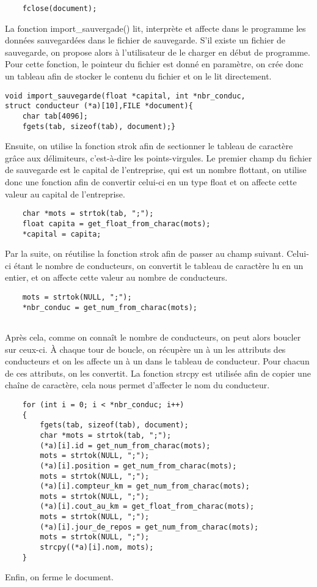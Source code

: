 \documentclass[a4paper, 12pt]{article}
\begin{document}
\begin{lstlisting}
    fclose(document);
\end{lstlisting}

        La fonction import\_sauvergade() lit, interprète et affecte dans le programme les données sauvegardées dans le fichier de sauvegarde. S’il existe un fichier de sauvegarde, on propose alors à l'utilisateur de le charger en début de programme.
        \newline
        Pour cette fonction, le pointeur du fichier est donné en paramètre, on crée donc un tableau afin de stocker le contenu du fichier et on le lit directement.
        \begin{lstlisting}
void import_sauvegarde(float *capital, int *nbr_conduc,
struct conducteur (*a)[10],FILE *document){
    char tab[4096];
    fgets(tab, sizeof(tab), document);}

\end{lstlisting}
    Ensuite, on utilise la fonction strok afin de sectionner le tableau de caractère grâce aux délimiteurs, c'est-à-dire les points-virgules. Le premier champ du fichier de sauvegarde est le capital de l'entreprise, qui est un nombre flottant, on utilise donc une fonction afin de convertir celui-ci en un type float et on affecte cette valeur au capital de l'entreprise.
\begin{lstlisting}
    char *mots = strtok(tab, ";");
    float capita = get_float_from_charac(mots);
    *capital = capita;
\end{lstlisting}
    Par la suite, on réutilise la fonction strok afin de passer au champ suivant. Celui-ci étant le nombre de conducteurs, on convertit le tableau de caractère lu en un entier, et on affecte cette valeur au nombre de conducteurs.
\begin{lstlisting}
    mots = strtok(NULL, ";"); 
    *nbr_conduc = get_num_from_charac(mots);
    
\end{lstlisting}
    Après cela, comme on connaît le nombre de conducteurs, on peut alors boucler sur ceux-ci. À chaque tour de boucle, on récupère un à un les attributs des conducteurs et on les affecte un à un dans le tableau de conducteur. Pour chacun de ces attributs, on les convertit. La fonction strcpy est utilisée afin de copier une chaîne de caractère, cela nous permet d'affecter le nom du conducteur.
\begin{lstlisting}
    for (int i = 0; i < *nbr_conduc; i++)
    {
        fgets(tab, sizeof(tab), document);
        char *mots = strtok(tab, ";");
        (*a)[i].id = get_num_from_charac(mots);
        mots = strtok(NULL, ";");
        (*a)[i].position = get_num_from_charac(mots);
        mots = strtok(NULL, ";");
        (*a)[i].compteur_km = get_num_from_charac(mots);
        mots = strtok(NULL, ";");
        (*a)[i].cout_au_km = get_float_from_charac(mots);
        mots = strtok(NULL, ";");
        (*a)[i].jour_de_repos = get_num_from_charac(mots);
        mots = strtok(NULL, ";");
        strcpy((*a)[i].nom, mots);
    }

\end{lstlisting}
Enfin, on ferme le document.
\end{document}
